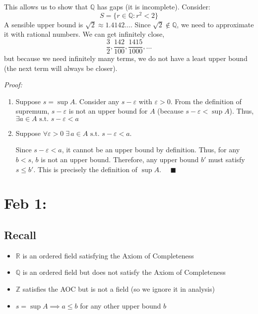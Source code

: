 \documentclass[12pt]{report}
\newcommand{\R}{\mathbb{R}}
\newcommand{\Z}{\mathbb{Z}}
\newcommand{\Q}{\mathbb{Q}}
\newcommand{\qed}{\quad \blacksquare}
\newcommand{\st}{\text{ s.t. }}
\newenvironment*{tbox}[2][gray]{
    \begin{tcolorbox}[
        parbox=false,
        colback=#1!5!white,
        colframe=#1!75!black,
        breakable,
        title={#2}
    ]}
    {\end{tcolorbox}}
\begin{document}
        This allows us to show that $\Q$ has gaps (it is incomplete). Consider: 
        \[S = \{r \in \Q: r^2 < 2\}\] 
        A sensible upper bound is $\sqrt 2 \approx 1.4142\dots$. Since $\sqrt 2 \notin \Q$, we need to approximate it with rational numbers. We can get infinitely close, 
        \[\frac{3}{2}, \frac{142}{100}, \frac{1415}{1000}, \dots\] 
        but because we need infinitely many terms, we do not have a least upper bound (the next term will always be closer). 

        \begin{tbox}{\textbf{Lemma:} Let $s \in \R$ be an upper bound for a set $A \subseteq \R$. Then $s = \sup A$ iff $\forall \varepsilon > 0\; \exists a \in A \st s - \varepsilon < a$}
            \emph{Proof:} 
            \begin{enumerate}
                \item Suppose $s = \sup A$. Consider any $s - \varepsilon$ with $\varepsilon > 0$. From the definition of supremum, $s - \varepsilon$ is not an upper bound for $A$ (because $s - \varepsilon < \sup A$). Thus, $\exists a \in A \st s - \varepsilon < a$ 

                \item Suppose $\forall \varepsilon > 0\; \exists\, a \in A \st s - \varepsilon < a$. 
                
                Since $s - \varepsilon < a$, it cannot be an upper bound by definition. Thus, for any $b < s$, $b$ is not an upper bound. Therefore, any upper bound $b'$ must satisfy $s \leq b'$. This is precisely the definition of $\sup A$. $\qed$
            \end{enumerate}
        \end{tbox}

\section{Feb 1:}
    \subsection*{Recall}
        \begin{itemize}
            \item $\R$ is an ordered field satisfying the Axiom of Completeness 
            \item $\Q$ is an ordered field but does not satisfy the Axiom of Completeness
            \item $\Z$ satisfies the AOC but is not a field (so we ignore it in analysis)
            \item $s = \sup A \implies a \leq b$ for any other upper bound $b$ 
        \end{itemize}
\end{document}
